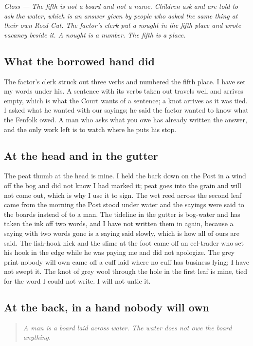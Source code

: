 \documentclass{design/chronicle}
\begin{document}
\emph{Gloss — The fifth is not a board and not a name. Children ask and are told to ask the water, which is an answer given by people who asked the same thing at their own Reed Cut. The factor’s clerk put a nought in the fifth place and wrote vacancy beside it. A nought is a number. The fifth is a place.}

\subsection*{What the borrowed hand did}

The factor’s clerk struck out three verbs and numbered the fifth place. I have set my words under his. A sentence with its verbs taken out travels well and arrives empty, which is what the Court wants of a sentence; a knot arrives as it was tied. I asked what he wanted with our sayings; he said the factor wanted to know what the Fenfolk owed. A man who asks what you owe has already written the answer, and the only work left is to watch where he puts his stop.

\subsection*{At the head and in the gutter}

The peat thumb at the head is mine. I held the bark down on the Post in a wind off the bog and did not know I had marked it; peat goes into the grain and will not come out, which is why I use it to sign. The wet reed across the second leaf came from the morning the Post stood under water and the sayings were said to the boards instead of to a man. The tideline in the gutter is bog-water and has taken the ink off two words, and I have not written them in again, because a saying with two words gone is a saying said slowly, which is how all of ours are said. The fish-hook nick and the slime at the foot came off an eel-trader who set his hook in the edge while he was paying me and did not apologize. The grey print nobody will own came off a cuff laid where no cuff has business lying; I have not swept it. The knot of grey wool through the hole in the first leaf is mine, tied for the word I could not write. I will not untie it.

\subsection*{At the back, in a hand nobody will own}

\begin{quote}\itshape A man is a board laid across water. The water does not owe the board anything.\end{quote}
\end{document}
